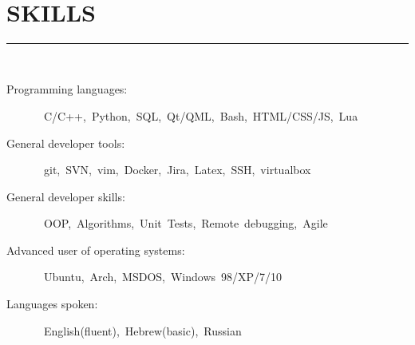 \documentclass[a4paper,oneside,12pt]{article}
\newcommand{\cvpart}[1]{%
\vspace{-1em}%
\section*{\large\bfseries\MakeTextUppercase{#1}}%
\vspace{-1em}%
\rule{\linewidth}{0.3em}\\[-.3em]%
}
\begin{document}
~\\

\cvpart{Skills}
\begin{description}
\item[Programming languages:]~C/C++,~Python,~SQL,~Qt/QML,~Bash,~HTML/CSS/JS,~Lua
\item[General developer tools:]~git,~SVN,~vim,~Docker,~Jira,~Latex,~SSH,~virtualbox
\item[General developer skills:]~OOP,~Algorithms,~Unit~Tests,~Remote~debugging,~Agile
\item[Advanced user of operating systems:]~Ubuntu,~Arch,~MSDOS,~Windows~98/XP/7/10
\item[Languages spoken:]~English(fluent),~Hebrew(basic),~Russian

\end{description}
\end{document}
